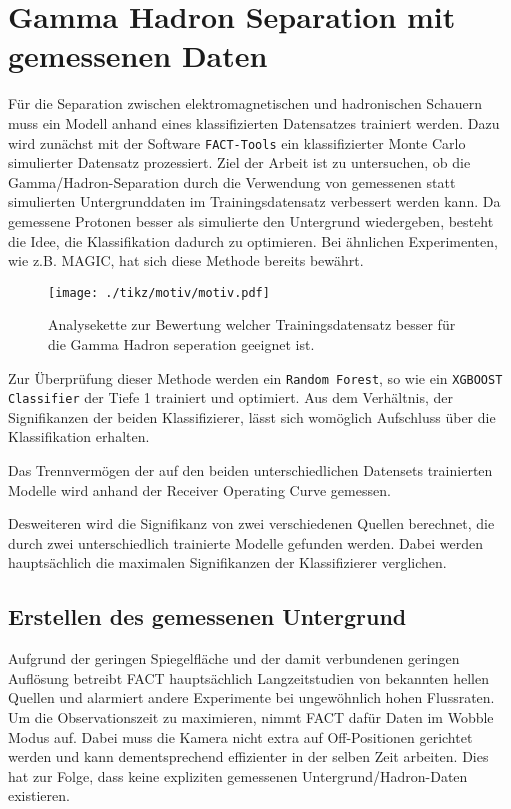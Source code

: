 \chapter{Gamma Hadron Separation mit gemessenen Daten}
Für die Separation zwischen elektromagnetischen und hadronischen Schauern muss ein Modell anhand eines klassifizierten Datensatzes trainiert werden.
Dazu wird zunächst mit der Software \texttt{FACT-Tools} ein klassifizierter Monte Carlo simulierter Datensatz prozessiert.
Ziel der Arbeit ist zu untersuchen, ob die Gamma/Hadron-Separation durch die Verwendung von gemessenen statt simulierten Untergrunddaten im Trainingsdatensatz verbessert werden kann.
Da gemessene Protonen besser als simulierte den Untergrund wiedergeben, besteht die Idee, die Klassifikation dadurch zu optimieren.
Bei ähnlichen Experimenten, wie z.B. MAGIC, hat sich diese Methode bereits bewährt. 
\begin{figure}[H]
  \centering
  \texttt{[image: ./tikz/motiv/motiv.pdf]}
  \caption{Analysekette zur Bewertung welcher Trainingsdatensatz besser für die Gamma Hadron seperation geeignet ist.}
\end{figure}
Zur Überprüfung dieser Methode werden ein \texttt{Random Forest}, so wie ein \texttt{XGBOOST Classifier} der Tiefe 1 trainiert und optimiert.
Aus dem Verhältnis, der Signifikanzen der beiden Klassifizierer, lässt sich womöglich Aufschluss über die Klassifikation erhalten.

Das Trennvermögen der auf den beiden unterschiedlichen Datensets trainierten Modelle wird anhand der Receiver Operating Curve gemessen.

Desweiteren wird die Signifikanz von zwei verschiedenen Quellen berechnet, die durch zwei unterschiedlich trainierte Modelle gefunden werden. 
Dabei werden hauptsächlich die maximalen Signifikanzen der Klassifizierer verglichen.
\section{Erstellen des gemessenen Untergrund}
\label{sec:makeUnter}
Aufgrund der geringen Spiegelfläche und der damit verbundenen geringen Auflösung betreibt FACT hauptsächlich Langzeitstudien von bekannten hellen Quellen und alarmiert andere Experimente bei ungewöhnlich hohen Flussraten.
Um die Observationszeit zu maximieren, nimmt FACT dafür Daten im Wobble Modus auf. 
Dabei muss die Kamera nicht extra auf Off-Positionen gerichtet werden und kann dementsprechend effizienter in der selben Zeit arbeiten. 
Dies hat zur Folge, dass keine expliziten gemessenen Untergrund/Hadron-Daten existieren. 


